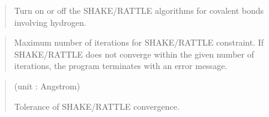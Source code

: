 \documentclass[a4paper,11pt,oneside,english]{sphinxmanual}
\begin{document}
 
\begin{quote}


Turn on or off the SHAKE/RATTLE algorithms for covalent bonds involving hydrogen.
\end{quote}

 
\begin{quote}


Maximum number of iterations for SHAKE/RATTLE constraint.
If SHAKE/RATTLE does not converge within the given number of iterations,
the program terminates with an error message.
\end{quote}

 
\begin{quote}

 (unit : Angstrom)

Tolerance of SHAKE/RATTLE convergence.
\end{quote}
\end{document}
